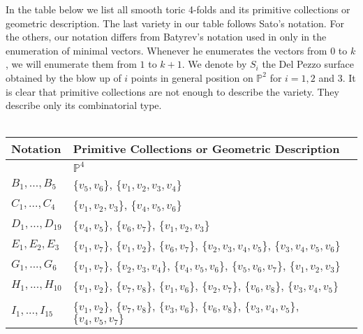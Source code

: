 \documentclass[10pt]{article}
\begin{document}
 In the table below we list all smooth toric 4-folds and its primitive collections or geometric description. The last variety in our table follows Sato's notation. For the others, our notation differs from Batyrev's notation used in \cite{bat} only in the enumeration of  minimal vectors. Whenever he enumerates the vectors from $0$ to $k$, we will enumerate them from $1$ to $k+1$. We denote by $S_i$ the Del Pezzo surface obtained by the blow up of $i$ points in general position on $\mathbb{P}^2$ for $i=1,2$ and 3. It is clear that primitive collections are not enough to describe the variety. They describe only its combinatorial type.  \\ \\


 \begin{tabular}{|p{2cm}| p{}|}
\hline
Notation & \hspace{2.5cm} Primitive Collections or Geometric Description  \\ 

\hline
& $\mathbb{P}^4$\\ \hline

$B_1,...,B_5$ & $\{v_5,v_6\}$, $\{v_1, v_2, v_3, v_4\}$ \\ \hline

$C_1,...,C_4$ & $\{v_1, v_2, v_3\}$, $\{v_4, v_5, v_6\}$\\ \hline

$D_1,...,D_{19}$ &  $\{v_4,v_5\}$, $\{v_6, v_7\}$, $\{v_1, v_2, v_3\}$ \\ 
\hline


$E_1,E_2,E_3$ & $\{v_1,v_7\}$, $\{v_1, v_2\}$, $\{v_6, v_7\}$, $\{v_2, v_3, v_4, v_5\}$, $\{v_3, v_4, v_5, v_6\}$  \\
\hline



 $G_1,...,G_6$ & $\{v_1, v_7\}$, $\{v_2, v_3, v_4\}$, $\{v_4, v_5, v_6\}$, $\{v_5, v_6, v_7\}$, $\{v_1, v_2, v_3\}$ \\
\hline

$H_1,...,H_{10}$ & $\{v_1, v_2\}$, $\{v_7, v_8\}$, $\{v_1, v_6\}$, $\{v_2, v_7\}$, $\{v_6, v_8\}$, $\{v_3, v_4, v_5\}$\\
\hline

 $I_1,...,I_{15}$ & $\{v_1,v_2\}$, $\{v_7, v_8\}$, $\{v_3,v_6\}$, $\{v_6,v_8\}$, $\{v_3, v_4, v_5\}$, $\{v_4, v_5, v_7\}$ \\
\hline
\end{tabular}
 
\end{document}

